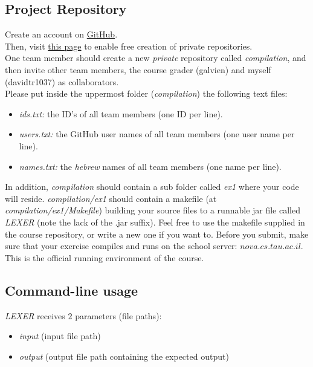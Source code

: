 \documentclass{article}
\begin{document}
\subsection{Project Repository}
Create an account on \href{https://github.com/}{GitHub}. \\
Then, visit \href{https://education.github.com/pack}{this page} to enable free creation of private repositories. \\
One team member should create a new \textit{private} repository called \textit{compilation},
and then invite other team members, the course grader (galvien) and myself (davidtr1037) as collaborators. \\
Please put inside the uppermost folder (\textit{compilation}) the following text files:
\begin{itemize}
    \item \textit{ids.txt:} the ID's of all team members (one ID per line).
    \item \textit{users.txt:} the GitHub user names of all team members (one user name per line).
    \item \textit{names.txt:} the \textit{hebrew} names of all team members (one name per line).
\end{itemize}

In addition, \textit{compilation} should contain a sub folder called \textit{ex1} where your code will reside.
\textit{compilation/ex1} should contain a makefile (at \textit{compilation/ex1/Makefile}) building your source files to a
runnable jar file called \textit{LEXER} (note the lack of the .jar suffix).
Feel free to use the makefile supplied in the course repository,
or write a new one if you want to. 
Before you submit, make sure that your exercise compiles and runs
on the school server: $nova.cs.tau.ac.il$.
This is the official running environment of the course.

\subsection{Command-line usage}
\textit{LEXER} receives $2$ parameters (file paths):
\begin{itemize}
    \item \textit{input} (input file path)
    \item \textit{output} (output file path containing the expected output)
\end{itemize}
\end{document}
